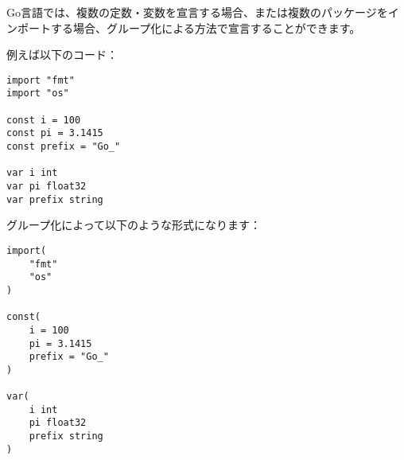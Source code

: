Go言語では、複数の定数・変数を宣言する場合、または複数のパッケージをインポートする場合、グループ化による方法で宣言することができます。

例えば以下のコード：

\begin{lstlisting}[numbers=none]
import "fmt"
import "os"

const i = 100
const pi = 3.1415
const prefix = "Go_"

var i int
var pi float32
var prefix string
\end{lstlisting}

グループ化によって以下のような形式になります：

\begin{lstlisting}[numbers=none]
import(
    "fmt"
    "os"
)

const(
    i = 100
    pi = 3.1415
    prefix = "Go_"
)

var(
    i int
    pi float32
    prefix string
)
\end{lstlisting}


